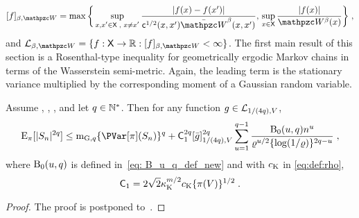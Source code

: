 \documentclass[sn-mathphys,Numbered]{sn-jnl}%
\begin{document}
\begin{equation*}
  \Nnorm[\beta, \lyapW]{f} = \max \bigg \{\sup_{\substack{x,x'\in\Xset\eqsp, \,\, x \neq x'}} \frac{|f(x) - f(x')|}{\metricc^{1/2}(x,x') \bar{\lyapW}^{\beta}(x,x')} , \, \sup_{x \in \Xset} \frac{|f(x)|}{\lyapW^{\beta}(x)} \bigg\}\eqsp,
\end{equation*}
and $\Lclass_{\beta,\lyapW} = \{f: \Xset \to \rset: \Nnorm[\beta,\lyapW]{f} < \infty\}$. The first main result of this section is a Rosenthal-type inequality for geometrically ergodic Markov chains in terms of the Wasserstein semi-metric. Again, the leading term is the stationary variance multiplied by the corresponding moment of a Gaussian random variable.
\begin{theorem}
\label{th:rosenthal_V_poly_wasserstein}
Assume , , , and let $q \in\mathbb{N}^*$.
Then for any function $g \in \mathcal L_{1/(4q), V}$,
\begin{equation}
\label{eq:wasser_scaling_main}
    \PE_\pi[|S_n|^{2q}] \leq \momentGq[q] \{\PVar[\pi](S_n)\}^q + \Constwasspoly^{2q} \Nnorm[1/(4q), V]{\bar{g}}^{2q} \sum_{u=1}^{q-1} \frac{\ConstB_0(u,q) n^{u}}{\ratewas^{u/2} \{\log(1/\ratewas)\}^{2q-u}}\eqsp,
\end{equation}
where $\operatorname{B}_0(u,q)$ is defined in~\eqref{eq: B_u_q_def_new} and with $c_{{\rm K}}$ in \eqref{eq:def:rho},
\begin{equation}
\label{eq:const_poly_class_wasserstein}
\mathsf{C}_1 = 2\sqrt{2} \kappa_{{\rm K}}^{m/2} c_{{\rm K}} \{\pi(V)\}^{1/2}\;.
\end{equation}
\end{theorem}
\begin{proof}
The proof is postponed to~.
\end{proof}
\end{document}
